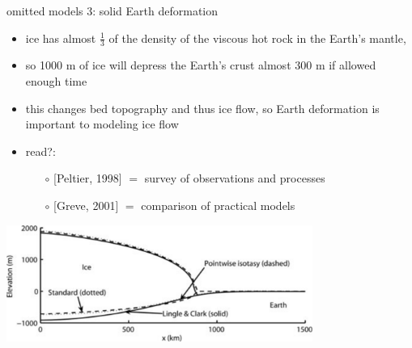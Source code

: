 \begin{frame}{omitted models 3: solid Earth deformation}

\begin{itemize}
\item ice has almost $\frac{1}{3}$ of the density of the viscous hot rock in the Earth's mantle,
\item so 1000 m of ice will depress the Earth's crust almost 300 m if allowed enough time
\item this changes bed topography and thus ice flow, so Earth deformation is important to modeling ice flow
\item read?:
  \begin{itemize}
  \item[$\circ$] [Peltier, 1998]\nocite{Peltier1998review} $=$ survey of observations and processes
  \item[$\circ$] [Greve, 2001]\nocite{Greve2001} $=$ comparison of practical models
  \end{itemize} 
\end{itemize}

\begin{center}
  \includegraphics[width=0.75\textwidth]{photos/earthcompare}
\end{center}
\end{frame}


